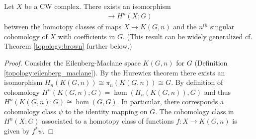     \begin{property}[Representability]
        Let $X$ be a CW complex. There exists an isomorphism
        \begin{gather}
            [X,K(G,n)]\rightarrow H^n(X;G)
        \end{gather}
        between the homotopy classes of maps $X\rightarrow K(G,n)$ and the $n^{th}$ singular cohomology of $X$ with coefficients in $G$. (This result can be widely generalized cf. Theorem \ref{topology:brown} further below.)

        \begin{proof}
            Consider the Eilenberg-Maclane space $K(G,n)$ for $G$ (Definition \ref{topology:eilenberg_maclane}). By the Hurewicz theorem there exists an isomorphism $H_n(K(G,n))\cong\pi_n(K(G,n))\cong G$. By definition of cohomology $H^n(K(G,n);G)=\hom(H_n(K(G,n)),G)$ and thus $H^n(K(G,n);G)\cong\hom(G,G)$. In particular, there corresponds a cohomology class $\psi$ to the identity mapping on $G$. The cohomology class in $H^n(X;G)$ associated to a homotopy class of functions $f:X\rightarrow K(G,n)$ is given by $f^*\psi$.
        \end{proof}
    \end{property}

\section{}

